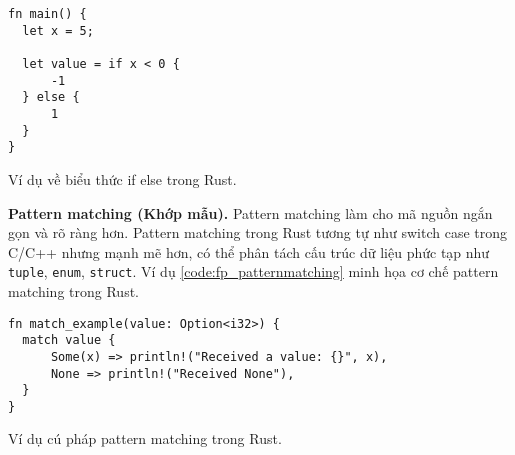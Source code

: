 \begin{listing}[H]
\begin{verbatim}
fn main() {
  let x = 5;

  let value = if x < 0 {
      -1
  } else {
      1
  }
}
\end{verbatim}
\caption{Ví dụ về biểu thức if else trong Rust.}
\label{code:fp_expression}
\end{listing}

\textbf{Pattern matching (Khớp mẫu).}
Pattern matching làm cho mã nguồn ngắn gọn và rõ ràng hơn.
Pattern matching trong Rust tương tự như switch case trong C/C++ nhưng mạnh mẽ hơn, có thể phân tách cấu trúc dữ liệu phức tạp như \texttt{tuple}, \texttt{enum}, \texttt{struct}.
Ví dụ \ref{code:fp_patternmatching} minh họa cơ chế pattern matching trong Rust.

\begin{listing}[H]
\begin{verbatim}
fn match_example(value: Option<i32>) {
  match value {
      Some(x) => println!("Received a value: {}", x),
      None => println!("Received None"),
  }
}
\end{verbatim}
\caption{Ví dụ cú pháp pattern matching trong Rust.}
\label{code:fp_patternmatching}
\end{listing}




